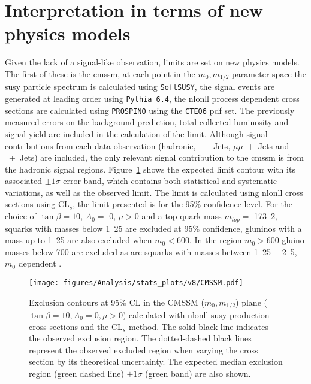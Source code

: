 \section{Interpretation in terms of new physics models} %
\label{cha:interpretation_in_terms_of_new_physics_models_}
Given the lack of a signal-like observation, limits are set on new physics 
models. The first of these is the \ac{cmssm}, at each point in the $m_{0}, 
m_{1/2}$ parameter space the \ac{susy} particle spectrum is calculated using 
\texttt{SoftSUSY}\cite{Allanach:2001kg}, the signal events are generated at 
leading order using \texttt{Pythia 6.4}\cite{pythia}, the \ac{nlonll} process 
dependent  cross sections are calculated using 
\texttt{PROSPINO}\cite{Beenakker:1996ch} using the \texttt{CTEQ6}\cite{cteq6.1} 
\ac{pdf} set. The previously measured errors on the background prediction, 
total collected luminosity and signal yield are included in the calculation of 
the limit. Although signal contributions from each data observation (hadronic, 
\Pmu~+~Jets, $\mu\mu$~+~Jets and \Pphoton~+~Jets) are included, the only 
relevant signal contribution to the \ac{cmssm} is from the hadronic signal 
regions.
Figure~\ref{fig:cmssm-limit} shows the expected limit contour with its 
associated $\pm1\sigma$ error band, which contains both statistical and 
systematic variations, as well as the observed limit. The limit is 
calculated using \ac{nlonll} cross sections using CL$_s$\cite{cls-pdg}, the 
limit presented is for the 95$\%$ confidence level. For the choice of 
$\tan\beta = 10$, $A_0 = $ \unit{0}{\GeV}, $\mu > 0$ and a top quark mass 
$m_{top} = $ \unit{173.2}{\GeV}, squarks with masses below \unit{1.25}{\TeV} 
are excluded at 95$\%$ confidence, gluninos with a mass up to \unit{1.25}{\TeV} 
are also excluded when $m_{0} < $\unit{600}{\GeV}. In the region $m_{0} > 
$\unit{600}{\GeV} gluino masses below \unit{700}{\GeV} are excluded as are 
squarks with masses between \unit{1.25-2.5}{\TeV}, $m_{0}$ dependent .

\begin{figure}[h!]
  \begin{center}
    \texttt{[image: figures/Analysis/stats\_plots/v8/CMSSM.pdf]}
    \caption{\label{fig:cmssm-limit} Exclusion contours at 95$\%$ CL in
      the CMSSM ($m_0, m_{1/2}$) plane ($\tan \beta = 10, A_0 = 0, \mu
      > 0$) calculated with \ac{nlonll} \ac{susy} production cross sections and
      the CL$_{s}$ method. The solid black line indicates the observed
      exclusion region. The dotted-dashed black lines represent the
      observed excluded region when varying the cross section by its
      theoretical uncertainty. The expected median exclusion region
      (green dashed line) $\pm 1 \sigma$ (green band) are also shown.}
  \end{center}
\end{figure}



